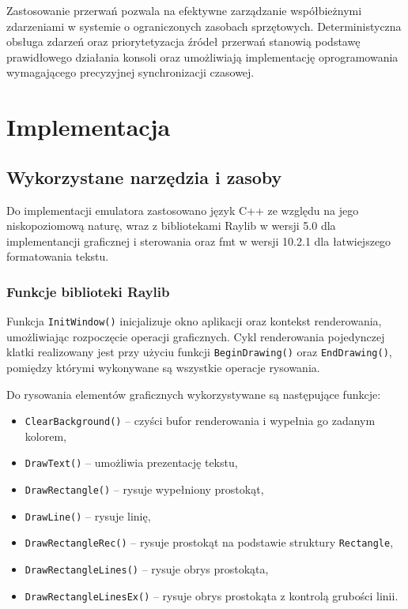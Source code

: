 \documentclass{article}
\begin{document}
Zastosowanie przerwań pozwala na efektywne zarządzanie współbieżnymi zdarzeniami w systemie o ograniczonych zasobach sprzętowych. Deterministyczna obsługa zdarzeń oraz priorytetyzacja źródeł przerwań stanowią podstawę prawidłowego działania konsoli oraz umożliwiają implementację oprogramowania wymagającego precyzyjnej synchronizacji czasowej.

\newpage
\section{Implementacja}

\subsection{Wykorzystane narzędzia i zasoby}

Do implementacji emulatora zastosowano język C++\cite{stroustrup2022tour} ze względu na jego niskopoziomową naturę, wraz z bibliotekami Raylib  w wersji 5.0 \cite{raylib} dla implementancji graficznej i sterowania oraz  fmt w wersji 10.2.1 \cite{fmt} dla łatwiejszego formatowania tekstu.

\subsubsection{Funkcje biblioteki Raylib}

Funkcja \texttt{InitWindow()} inicjalizuje okno aplikacji oraz kontekst renderowania,
umożliwiając rozpoczęcie operacji graficznych. Cykl renderowania pojedynczej klatki
realizowany jest przy użyciu funkcji \texttt{BeginDrawing()} oraz \texttt{EndDrawing()},
pomiędzy którymi wykonywane są wszystkie operacje rysowania.

Do rysowania elementów graficznych wykorzystywane są następujące funkcje:
\begin{itemize}
	\item \texttt{ClearBackground()} -- czyści bufor renderowania i wypełnia go zadanym kolorem,
	\item \texttt{DrawText()} -- umożliwia prezentację tekstu,
	\item \texttt{DrawRectangle()} -- rysuje wypełniony prostokąt,
	\item \texttt{DrawLine()} -- rysuje linię,
	\item \texttt{DrawRectangleRec()} -- rysuje prostokąt na podstawie struktury \texttt{Rectangle},
	\item \texttt{DrawRectangleLines()} -- rysuje obrys prostokąta,
	\item \texttt{DrawRectangleLinesEx()} -- rysuje obrys prostokąta z kontrolą grubości linii.
\end{itemize}
\end{document}
